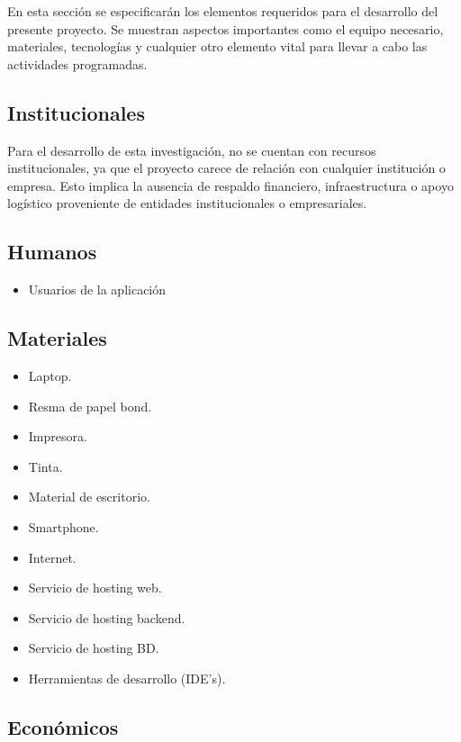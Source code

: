 En esta sección se especificarán los elementos requeridos para el desarrollo del presente proyecto.
Se muestran aspectos importantes como el equipo necesario, materiales, tecnologías y cualquier otro
elemento vital para llevar a cabo las actividades programadas.
\subsection{Institucionales}
Para el desarrollo de esta investigación, no se cuentan con recursos institucionales, ya que el proyecto
carece de relación con cualquier institución o empresa. Esto implica la ausencia de respaldo financiero,
infraestructura o apoyo logístico proveniente de entidades institucionales o empresariales.

\subsection{Humanos}
\begin{itemize}
    \item Usuarios de la aplicación
\end{itemize}

\subsection{Materiales}
\begin{itemize}
    \item Laptop.
    \item Resma de papel bond.
    \item Impresora.
    \item Tinta.
    \item Material de escritorio.
    \item Smartphone.
    \item Internet.
    \item Servicio de hosting web.
    \item Servicio de hosting backend.
    \item Servicio de hosting BD.
    \item Herramientas de desarrollo (IDE's).
\end{itemize}

\newpage
\subsection{Económicos}


